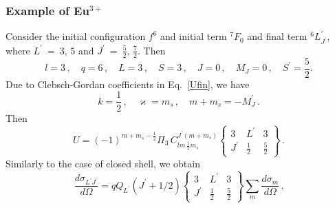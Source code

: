 \documentclass[a4paper,oneside,12pt]{extarticle}
\begin{document}
\subsubsection {Example of Eu$^{3+}$}
Consider the initial configuration $f^6$ and initial term $^7F_0$
and final term $^6L^{\prime}_{J^{\prime}}$, where $L^{\prime}~=~3,\,5$ and
$J^{\prime}~=~\frac{5}{2},\,\frac{7}{2}$.
Then
%
$$
l=3 \,, \quad q=6 \,, \quad L=3 \,, \quad S=3 \,, \quad J=0 \,, \quad
M_J=0 \,, \quad S^{\prime}=\frac{5}{2}.
$$
%
Due to Clebsch-Gordan coefficients in Eq.~\ref{Ufin}, we have
$$
k=\frac{1}{2}\,, \quad \varkappa=m_s\,, \quad m+m_s=-M_J^{\prime}\,.
$$
%
Then
%
\begin{equation}
U=
(-1)^{m+m_s-\frac{1}{2}}
\Pi_{3} \,
C^{J^{\prime} (m+m_s)}_{lm \, \frac{1}{2} m_s}
\left \{
\begin{array}{ccc}
3 & L^{\prime} & 3 \\
J^{\prime} & \frac{1}{2} & \frac{5}{2}
\end{array}
\right \} \,.
\end{equation}
Similarly to the case of closed shell, we obtain
$$
\frac{d \sigma_{L^{\prime}J^{\prime}}}{d \Omega} = q Q_{L^{\prime}}  (J^\prime + 1/2)
\left \{
\begin{array}{ccc}
3 & L^{\prime} & 3 \\
J^{\prime} & \frac{1}{2} & \frac{5}{2}
\end{array}
\right \}
\sum_{m}
\frac{d \sigma_{m}}{d \Omega} \,.
$$
%


\end{document}
